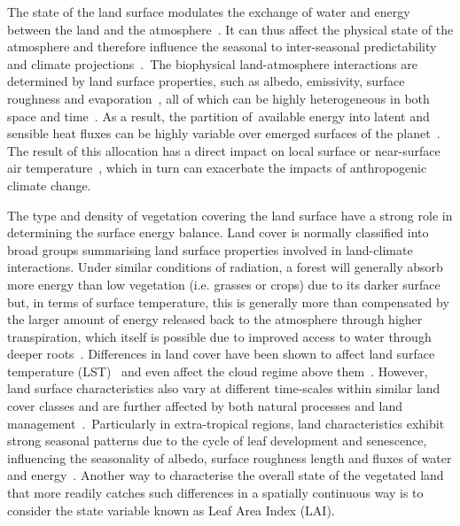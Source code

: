 \documentclass[gmd, manuscript]{copernicus}
\begin{document}
The state of the land surface modulates the exchange of water and energy
between the land and the atmosphere~\citep{Seneviratne_2010}. It can thus
affect the physical state of the atmosphere and therefore influence the
seasonal to inter-seasonal predictability and climate
projections~\citep{Koster_2004}.~The biophysical land-atmosphere
interactions are determined by land surface properties, such as albedo,
emissivity, surface roughness and evaporation~\citep{anderson2012climate}, all of
which can be highly heterogeneous in both space and
time~\citep{santanello2018land}. As a result, the partition of~available energy
into latent and sensible heat fluxes can be highly variable over emerged
surfaces of the planet~\citep{dickinson1995land}. The result of this allocation
has a direct impact on local surface or near-surface air
temperature~\citep{pielke2002influence}, which in turn can exacerbate the impacts
of anthropogenic climate change.~

The type and density of vegetation covering the land surface have a
strong role in determining the surface energy balance. Land cover is
normally classified into broad groups summarising land surface
properties involved in land-climate interactions. Under similar
conditions of radiation, a forest will generally absorb more energy than
low vegetation (i.e. grasses or crops) due to its darker surface but, in
terms of surface temperature, this is generally more than compensated by
the larger amount of energy released back to the atmosphere through
higher transpiration, which itself is possible due to improved access to
water through deeper roots~\citep{Bonan2008}. Differences in land cover
have been shown to affect land surface temperature
(LST)~\citep{Duveiller_2018, Alkama2016, Li2015} and even affect the cloud regime above
them~\citep{Duveiller_2021, Xu2022}. However, land surface characteristics also vary
at different time-scales within similar land cover classes and are
further affected by both natural processes and land
management~\citep{anderson2011biophysical}.~Particularly in extra-tropical regions,
land characteristics exhibit strong seasonal patterns due to the cycle
of leaf development and senescence, influencing the seasonality of
albedo, surface roughness length and fluxes of water
and energy~\citep{RICHARDSON2013156}. Another way to characterise the overall
state of the vegetated land that more readily catches such differences
in a spatially continuous way is to consider the state variable known as
Leaf Area Index (LAI).
\end{document}
